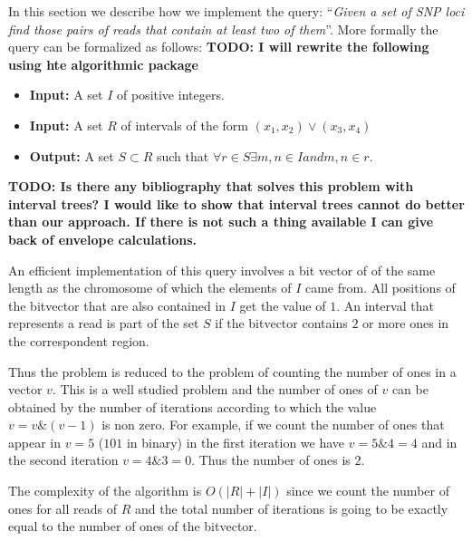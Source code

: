 \documentclass[10pt,fullpage]{article}
\begin{document}
In this section we describe how we implement the query:	``{\em Given a set 
of SNP loci find those pairs of reads that contain at least two of
them}''. More formally the query can be formalized as follows: {\bf
TODO: I will rewrite the following using hte algorithmic package}

\begin{itemize}
\item {\bf Input: } A set $I$ of positive integers.
\item {\bf Input: } A set $R$ of intervals of the form $\left(x_1,
x_2\right)\vee\left(x_3, x_4\right)$
\item {\bf Output: } A set $S \subset R$ such that $\forall r \in S
\exists m,n \in I and m,n \in r$.
\end{itemize}

{\bf TODO: Is there any bibliography that solves this problem with
interval trees? I would like to show that interval trees cannot do
better than our approach. If there is not such a thing available I can
give back of envelope calculations.}

An efficient implementation of this query involves a bit vector of of
the same length as the chromosome of which the elements of $I$ came
from. All positions of the bitvector that are also contained in $I$
get the value of $1$. An interval that represents a read is part of
the set $S$ if the bitvector contains $2$ or more ones in the
correspondent region.

Thus the problem is reduced to the problem of counting the number of
ones in a vector $v$. This is a well studied problem and the
number of ones of $v$ can be obtained by the number of iterations
according to which the value $v=v\&(v-1)$ is non zero. For example, if
we count the number of ones that appear in $v=5$ ($101$ in binary) in
the first iteration we have $v=5\&4=4$ and in the second iteration
$v=4\&3=0$. Thus the number of ones is $2$. 

The complexity of the algorithm is $O(|R|+|I|)$ since we count the
number of ones for all reads of $R$ and the total number of iterations
is going to be exactly equal to the number of ones of the bitvector.


\newpage
\appendix
\appendixpage
\end{document}
